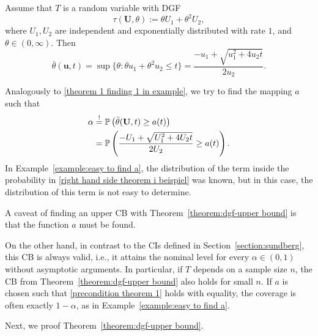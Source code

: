 \begin{example}\label{example:hard to find a}
	Assume that $T$ is a random variable with DGF
	\[
	\tau (\mathbf U, \theta) := \theta U_1 + \theta^2 U_2,
	\]
	where $U_1, U_2$ are independent and exponentially distributed with rate $1$, and $\theta \in (0, \infty)$.
	Then
	\[
	\bar \theta (\mathbf u, t)
	=
	\sup \{ \theta : \theta u_1 + \theta^2 u_2 \leq t \}
	=
	\frac{- u_1 + \sqrt{u_1^2 + 4 u_2 t}}{2 u_2}.
	\]
	
	Analogously to \eqref{theorem 1 finding 1 in example}, we try to find the mapping $a$ such that
	\begin{align}
		\alpha
		&\overset{!}{=}
		\mathbb{P} \left( \bar \theta (\mathbf U, t) \geq a(t) \right) \notag \\
		&=
		\mathbb{P} \left(
		\frac{- U_1 + \sqrt{U_1^2 + 4 U_2 t}}{2 U_2}
		\geq a(t) \right). \label{right hand side theorem i beispiel}
	\end{align}
	In Example~\ref{example:easy to find a}, the distribution of the term inside the probability in \eqref{right hand side theorem i beispiel} was known, but in this case, the distribution of this term is not easy to determine.
\end{example}

A caveat of finding an upper CB with Theorem~\ref{theorem:dgf-upper bound} is that the function $a$ must be found.

On the other hand, in contrast to the CIs defined in Section~\ref{section:sundberg}, this CB is always valid, i.e., it attains the nominal level for every $\alpha \in (0,1)$ without asymptotic arguments. In particular, if $T$ depends on a sample size $n$, the CB from Theorem~\ref{theorem:dgf-upper bound} also holds for small $n$. If $a$ is chosen such that \eqref{precondition theorem 1} holds with equality, the coverage is often exactly $1-\alpha$, as in Example~\ref{example:easy to find a}.

Next, we proof Theorem~\ref{theorem:dgf-upper bound}.
	
